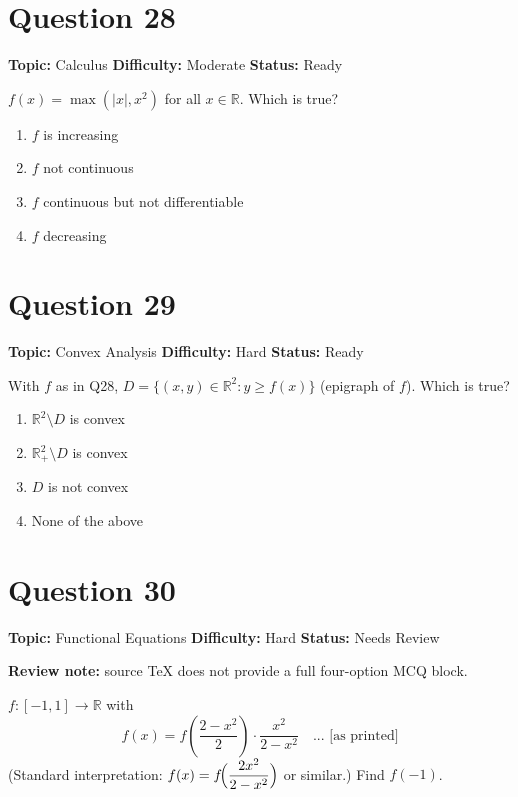 \documentclass[11pt]{article}
\begin{document}
\newpage

\section*{Question 28}


\noindent\textbf{Topic:} Calculus \quad \textbf{Difficulty:} Moderate \quad \textbf{Status:} Ready



$f(x)=\max(|x|,x^2)$ for all $x\in\mathbb R$. Which is true?
\begin{enumerate}[label=(\Alph*)]
\item $f$ is increasing \item $f$ not continuous \item $f$ continuous but not differentiable \item $f$ decreasing
\end{enumerate}

\newpage

\section*{Question 29}


\noindent\textbf{Topic:} Convex Analysis \quad \textbf{Difficulty:} Hard \quad \textbf{Status:} Ready



With $f$ as in Q28, $D=\{(x,y)\in\mathbb R^2:y\ge f(x)\}$ (epigraph of $f$). Which is true?
\begin{enumerate}[label=(\Alph*)]
\item $\mathbb R^2\setminus D$ is convex \item $\mathbb R^2_+\setminus D$ is convex \item $D$ is not convex \item None of the above
\end{enumerate}

\newpage

\section*{Question 30}


\noindent\textbf{Topic:} Functional Equations \quad \textbf{Difficulty:} Hard \quad \textbf{Status:} Needs Review

\par\noindent\textcolor{StatAmber}{\textbf{Review note:} source TeX does not provide a full four-option MCQ block.}


$f:[-1,1]\to\mathbb R$ with
\[
f(x)=f\!\left(\frac{2-x^2}{2}\right)\cdot\frac{x^2}{2-x^2}\quad\text{... [as printed]}
\]
(Standard interpretation: $f(x)=f\!\Bigl(\dfrac{2x^2}{2-x^2}\Bigr)$ or similar.) Find $f(-1)$.
\end{document}
